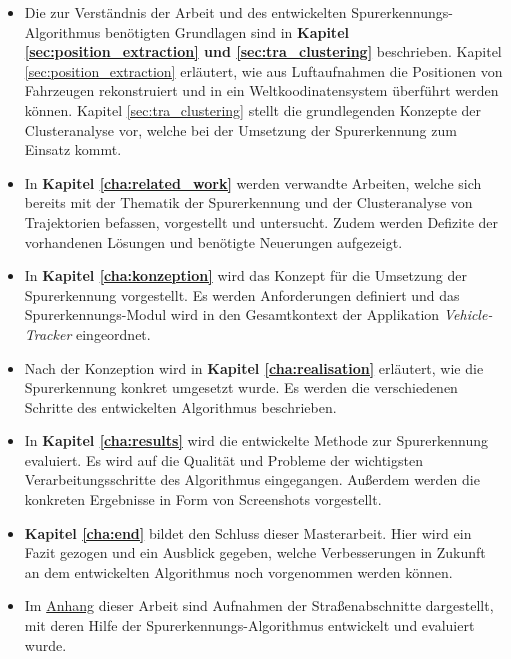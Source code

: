 \begin{itemize}
    \item Die zur Verständnis der Arbeit und des entwickelten Spurerkennungs-Algorithmus benötigten
            Grundlagen sind in \textbf{Kapitel \ref{sec:position_extraction} und \ref{sec:tra_clustering}} beschrieben.
            Kapitel \ref{sec:position_extraction} erläutert, wie aus Luftaufnahmen die Positionen von Fahrzeugen
            rekonstruiert und in ein Weltkoodinatensystem überführt werden können.
            Kapitel \ref{sec:tra_clustering} stellt die grundlegenden Konzepte der Clusteranalyse vor, welche
            bei der Umsetzung der Spurerkennung zum Einsatz kommt.
    \item In \textbf{Kapitel \ref{cha:related_work}} werden verwandte Arbeiten, welche sich bereits mit
            der Thematik der Spurerkennung und der Clusteranalyse von Trajektorien befassen, vorgestellt und untersucht.
            Zudem werden Defizite der vorhandenen Lösungen und benötigte Neuerungen aufgezeigt.
    \item In \textbf{Kapitel \ref{cha:konzeption}} wird das Konzept für die Umsetzung der Spurerkennung vorgestellt.
            Es werden Anforderungen definiert und das Spurerkennungs-Modul wird in den Gesamtkontext
            der Applikation \textit{Vehicle-Tracker} eingeordnet.
    \item Nach der Konzeption wird in \textbf{Kapitel \ref{cha:realisation}} erläutert, wie die Spurerkennung konkret
            umgesetzt wurde. Es werden die verschiedenen Schritte des entwickelten Algorithmus beschrieben.
    \item In \textbf{Kapitel \ref{cha:results}} wird die entwickelte Methode zur Spurerkennung evaluiert.
            Es wird auf die Qualität und Probleme der wichtigsten Verarbeitungsschritte des Algorithmus eingegangen.
            Außerdem werden die konkreten Ergebnisse in Form von Screenshots vorgestellt.
    \item \textbf{Kapitel \ref{cha:end}} bildet den Schluss dieser Masterarbeit. Hier wird
            ein Fazit gezogen und ein Ausblick gegeben, welche Verbesserungen in Zukunft an dem entwickelten
            Algorithmus noch vorgenommen werden können.
    \item Im \hyperref[cha:anhang_a]{Anhang} dieser Arbeit sind Aufnahmen der Straßenabschnitte dargestellt,
            mit deren Hilfe der Spurerkennungs-Algorithmus entwickelt und evaluiert wurde.
\end{itemize}

